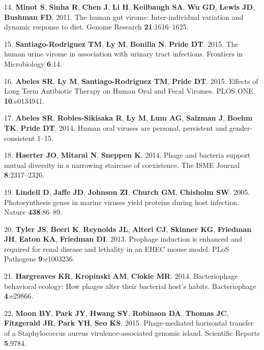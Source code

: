 \documentclass[12pt,]{article}
\begin{document}
\hypertarget{ref-Minot:2011ez}{}
14. \textbf{Minot S}, \textbf{Sinha R}, \textbf{Chen J}, \textbf{Li H},
\textbf{Keilbaugh SA}, \textbf{Wu GD}, \textbf{Lewis JD},
\textbf{Bushman FD}. 2011. The human gut virome: Inter-individual
variation and dynamic response to diet. Genome Research
\textbf{21}:1616--1625.

\hypertarget{ref-SantiagoRodriguez:2015gd}{}
15. \textbf{Santiago-Rodriguez TM}, \textbf{Ly M}, \textbf{Bonilla N},
\textbf{Pride DT}. 2015. The human urine virome in association with
urinary tract infections. Frontiers in Microbiology \textbf{6}:14.

\hypertarget{ref-Abeles:2015dy}{}
16. \textbf{Abeles SR}, \textbf{Ly M}, \textbf{Santiago-Rodriguez TM},
\textbf{Pride DT}. 2015. Effects of Long Term Antibiotic Therapy on
Human Oral and Fecal Viromes. PLOS ONE \textbf{10}:e0134941.

\hypertarget{ref-Abeles:2014kj}{}
17. \textbf{Abeles SR}, \textbf{Robles-Sikisaka R}, \textbf{Ly M},
\textbf{Lum AG}, \textbf{Salzman J}, \textbf{Boehm TK}, \textbf{Pride
DT}. 2014. Human oral viruses are personal, persistent and
gender-consistent 1--15.

\hypertarget{ref-Haerter:2014ii}{}
18. \textbf{Haerter JO}, \textbf{Mitarai N}, \textbf{Sneppen K}. 2014.
Phage and bacteria support mutual diversity in a narrowing staircase of
coexistence. The ISME Journal \textbf{8}:2317--2326.

\hypertarget{ref-Lindell:2005gz}{}
19. \textbf{Lindell D}, \textbf{Jaffe JD}, \textbf{Johnson ZI},
\textbf{Church GM}, \textbf{Chisholm SW}. 2005. Photosynthesis genes in
marine viruses yield proteins during host infection. Nature
\textbf{438}:86--89.

\hypertarget{ref-Tyler:2013fl}{}
20. \textbf{Tyler JS}, \textbf{Beeri K}, \textbf{Reynolds JL},
\textbf{Alteri CJ}, \textbf{Skinner KG}, \textbf{Friedman JH},
\textbf{Eaton KA}, \textbf{Friedman DI}. 2013. Prophage induction is
enhanced and required for renal disease and lethality in an EHEC mouse
model. PLoS Pathogens \textbf{9}:e1003236.

\hypertarget{ref-Hargreaves:2014ja}{}
21. \textbf{Hargreaves KR}, \textbf{Kropinski AM}, \textbf{Clokie MR}.
2014. Bacteriophage behavioral ecology: How phages alter their bacterial
host's habits. Bacteriophage \textbf{4}:e29866.

\hypertarget{ref-Moon:2015fa}{}
22. \textbf{Moon BY}, \textbf{Park JY}, \textbf{Hwang SY},
\textbf{Robinson DA}, \textbf{Thomas JC}, \textbf{Fitzgerald JR},
\textbf{Park YH}, \textbf{Seo KS}. 2015. Phage-mediated horizontal
transfer of a Staphylococcus aureus virulence-associated genomic island.
Scientific Reports \textbf{5}:9784.
\end{document}
